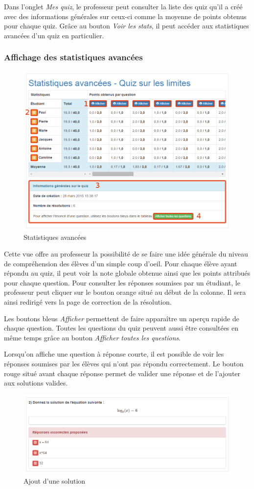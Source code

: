 \documentclass[a4,10pt,french]{sphinxmanual}
\begin{document}
Dans l'onglet \emph{Mes quiz}, le professeur peut consulter la liste des quiz qu'il a créé avec des informations générales sur ceux-ci comme la moyenne de points obtenus pour chaque quiz. Grâce au bouton \emph{Voir les stats}, il peut accéder aux statistiques avancées d'un quiz en particulier.


\subsubsection{Affichage des statistiques avancées}
\label{doc-user:affichage-des-statistiques-avancees}\begin{figure}[htbp]
\centering
\capstart

\includegraphics[width=0.700\linewidth]{stats.png}
\caption{Statistiques avancées}\end{figure}

Cette vue offre au professeur la possibilité de se faire une idée générale du niveau de compréhension des élèves d'un simple coup d'oeil. Pour chaque élève ayant répondu au quiz, il peut voir la note globale obtenue ainsi que les points attribués pour chaque question. Pour consulter les réponses soumises par un étudiant, le professeur peut cliquer sur le bouton orange situé au début de la colonne. Il sera ainsi redirigé vers la page de correction de la résolution.

Les boutons bleus \emph{Afficher} permettent de faire apparaître un aperçu rapide de chaque question. Toutes les questions du quiz peuvent aussi être consultées en même temps grâce au bouton \emph{Afficher toutes les questions}.

Lorsqu'on affiche une question à réponse courte, il est possible de voir les réponses soumises par les élèves qui n'ont pas répondu correctement. Le bouton rouge situé avant chaque réponse permet de valider une réponse et de l'ajouter aux solutions valides.
\begin{figure}[htbp]
\centering
\capstart

\includegraphics[width=0.700\linewidth]{add-solution.png}
\caption{Ajout d'une solution}\end{figure}
\end{document}
